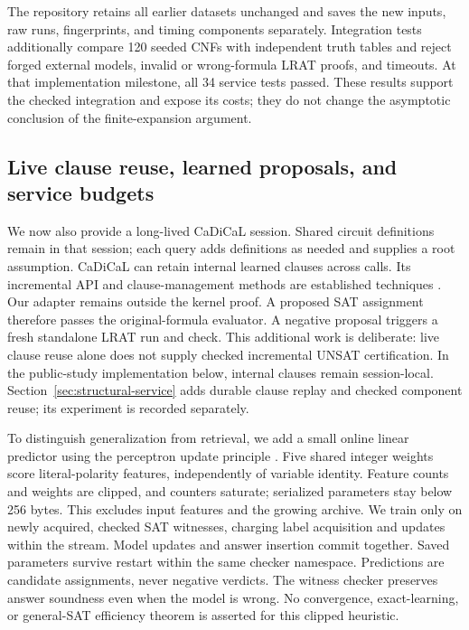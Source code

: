 \documentclass[11pt,a4paper]{article}
\numberwithin{equation}{section}
\theoremstyle{plain}
\theoremstyle{definition}
\theoremstyle{remark}
\begin{document}
The repository retains all earlier datasets unchanged and saves the new inputs, raw runs, fingerprints, and timing components separately. Integration tests additionally compare 120 seeded CNFs with independent truth tables and reject forged external models, invalid or wrong-formula LRAT proofs, and timeouts. At that implementation milestone, all 34 service tests passed. These results support the checked integration and expose its costs; they do not change the asymptotic conclusion of the finite-expansion argument.

\subsection{Live clause reuse, learned proposals, and service budgets}
\label{sec:expanded-service}

We now also provide a long-lived CaDiCaL session. Shared circuit definitions remain in that session; each query adds definitions as needed and supplies a root assumption. CaDiCaL can retain internal learned clauses across calls. Its incremental API and clause-management methods are established techniques \citep{biere2024cadical,fazekas2024incremental}. Our adapter remains outside the kernel proof. A proposed SAT assignment therefore passes the original-formula evaluator. A negative proposal triggers a fresh standalone LRAT run and check. This additional work is deliberate: live clause reuse alone does not supply checked incremental UNSAT certification. In the public-study implementation below, internal clauses remain session-local. Section~\ref{sec:structural-service} adds durable clause replay and checked component reuse; its experiment is recorded separately.

To distinguish generalization from retrieval, we add a small online linear predictor using the perceptron update principle \citep{rosenblatt1958}. Five shared integer weights score literal-polarity features, independently of variable identity. Feature counts and weights are clipped, and counters saturate; serialized parameters stay below 256 bytes. This excludes input features and the growing archive. We train only on newly acquired, checked SAT witnesses, charging label acquisition and updates within the stream. Model updates and answer insertion commit together. Saved parameters survive restart within the same checker namespace. Predictions are candidate assignments, never negative verdicts. The witness checker preserves answer soundness even when the model is wrong. No convergence, exact-learning, or general-SAT efficiency theorem is asserted for this clipped heuristic.
\end{document}
